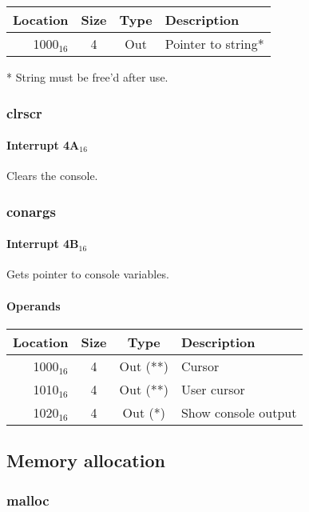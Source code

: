 \documentclass{article}
\begin{document}
\begin{tabular}{|r|c|c|l|}
	\hline
	\textbf{Location} & \textbf{Size} & \textbf{Type} & \textbf{Description} \\
	\hline
	1000$_{16}$ & 4 & Out & Pointer to string* \\
	\hline
\end{tabular}

* String must be free'd after use.

\subsubsection{clrscr}

\paragraph{Interrupt 4A$_{16}$}

Clears the console.

\subsubsection{conargs}

\paragraph{Interrupt 4B$_{16}$}

Gets pointer to console variables.

\paragraph{Operands}

\begin{tabular}{|r|c|c|l|}
	\hline
	\textbf{Location} & \textbf{Size} & \textbf{Type} & \textbf{Description} \\
	\hline
	1000$_{16}$ & 4 & Out (**) & Cursor \\
	\hline
	1010$_{16}$ & 4 & Out (**) & User cursor \\
	\hline
	1020$_{16}$ & 4 & Out (*) & Show console output \\
	\hline
\end{tabular}

\subsection{Memory allocation}

\subsubsection{malloc}
\end{document}
